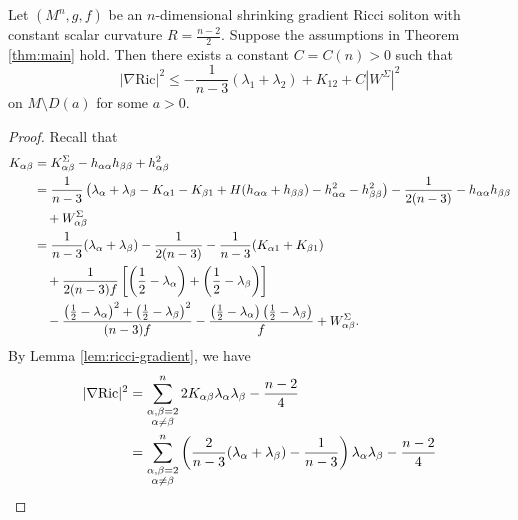 \documentclass[10pt,a4paper]{amsart}
\begin{document}
\begin{prop}\label{prop:key-estimate}
	Let $(M^n, g, f)$ be an $n$-dimensional shrinking gradient Ricci soliton with constant scalar curvature $R = \frac{n-2}{2}$. Suppose the assumptions in Theorem \ref{thm:main} hold. Then there exists a constant $C = C(n) > 0$ such that
	\[
	|\nabla \mathrm{Ric}|^2 \leq -\frac{1}{n-3}(\lambda_1+\lambda_2) + K_{12} + C|W^{\Sigma}|^2
	\]
	on $M \setminus D(a)$ for some $a > 0$.
\end{prop}

\begin{proof}
	Recall that
\begin{equation*}
	\begin{aligned}
		K_{\alpha\beta} &= K^{\Sigma}_{\alpha\beta} - h_{\alpha\alpha}h_{\beta\beta} + h_{\alpha\beta}^2 \notag \\
		&= \frac{1}{n-3}\left(\lambda_{\alpha} + \lambda_{\beta} - K_{\alpha 1} - K_{\beta 1} + H(h_{\alpha\alpha} + h_{\beta\beta}) - h_{\alpha\alpha}^2 - h_{\beta\beta}^2\right) - \frac{1}{2(n-3)} - h_{\alpha\alpha}h_{\beta\beta} \notag \\
		&\quad + W^{\Sigma}_{\alpha\beta} \notag \\
		&= \frac{1}{n-3}(\lambda_{\alpha} + \lambda_{\beta}) - \frac{1}{2(n-3)} - \frac{1}{n-3}(K_{\alpha 1} + K_{\beta 1}) \notag \\
		&\quad + \frac{1}{2(n-3)f}\left[\left(\frac{1}{2} - \lambda_{\alpha}\right) + \left(\frac{1}{2} - \lambda_{\beta}\right)\right] \notag \\
		&\quad - \frac{\left(\frac{1}{2} - \lambda_{\alpha}\right)^2 + \left(\frac{1}{2} - \lambda_{\beta}\right)^2}{(n-3)f} - \frac{\left(\frac{1}{2} - \lambda_{\alpha}\right)\left(\frac{1}{2} - \lambda_{\beta}\right)}{f} + W^{\Sigma}_{\alpha\beta}. \label{eq:K-alpha-beta}
	\end{aligned}
\end{equation*}
	By Lemma \ref{lem:ricci-gradient}, we have
	\begin{equation*}
	\begin{aligned}
		|\nabla \mathrm{Ric}|^2 &= \sum_{\substack{\alpha,\beta=2 \\ \alpha\neq\beta}}^n 2K_{\alpha\beta}\lambda_{\alpha}\lambda_{\beta} - \frac{n-2}{4} \notag \\
		&= \sum_{\substack{\alpha,\beta=2 \\ \alpha\neq\beta}}^n \left(\frac{2}{n-3}(\lambda_{\alpha} + \lambda_{\beta}) - \frac{1}{n-3}\right)\lambda_{\alpha}\lambda_{\beta} - \frac{n-2}{4} \notag \\

\end{aligned}
\end{equation*}
\end{proof}
\end{document}

